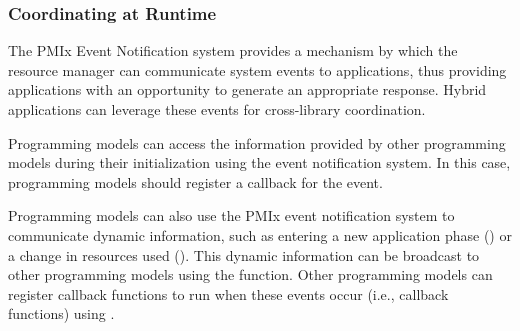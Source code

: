 \subsubsection{Coordinating at Runtime}

The PMIx Event Notification system provides a mechanism by which the resource manager can communicate system events to applications, thus providing applications with an opportunity to generate an appropriate response. Hybrid applications can leverage these events for cross-library coordination.

Programming models can access the information provided by other programming models during their initialization using the event notification system.  In this case, programming models should register a callback for the  event.

Programming models can also use the PMIx event notification system to communicate dynamic information, such as entering a new application phase () or a change in resources used ().  This dynamic information can be broadcast to other programming models using the  function.  Other programming models can register callback functions to run when these events occur (i.e., callback functions) using .

\relatedapis

{\large {}}

 \\
 \\
 \\
 \\

{\large {}}


{\large {}}



\example


